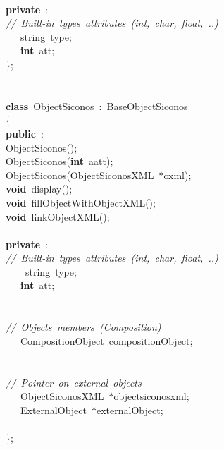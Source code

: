 {\ \\
\textbf{private}\ :\\
\textsl{//\ Built-{}in\ types\ attributes\ (int,\ char,\ float,\ ..)}\\
\ \ \ string\ type;\ \\
\ \ \ \textbf{int}\ att;\\
\};\\
\ \\
\ \\
\textbf{class}\ ObjectSiconos\ :\ BaseObjectSiconos\\
\{\\
\textbf{public}\ :\\
ObjectSiconos();\\
ObjectSiconos(\textbf{int}\ aatt);\\
ObjectSiconos(ObjectSiconosXML\ $\ast$oxml);\\
\textbf{void}\ display();\\
\textbf{void}\ fillObjectWithObjectXML();\\
\textbf{void}\ linkObjectXML();\\
\ \\
\textbf{private}\ :\\
\textsl{//\ Built-{}in\ types\ attributes\ (int,\ char,\ float,\ ..)}\\
\ \ \ \ string\ type;\ \\
\ \ \ \textbf{int}\ att;\\
\ \\
\ \\
\textsl{//\ Objects\ members\ (Composition)}\\
\ \ \ CompositionObject\ compositionObject;\\
\ \\
\ \\
\textsl{//\ Pointer\ on\ external\ objects}\\
\ \ \ ObjectSiconosXML\ $\ast$objectsiconosxml;\\
\ \ \ ExternalObject\ $\ast$externalObject;\\
\ \\
\};\\
\ \\
\ \\
 }
\normalfont\normalsize

